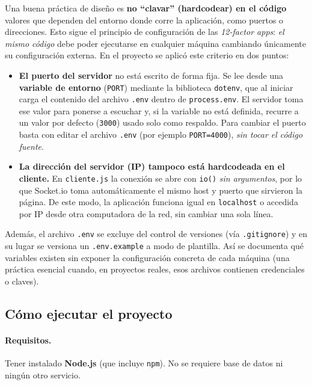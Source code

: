 \documentclass[12pt,a4paper]{article}
\begin{document}
Una buena práctica de diseño es \textbf{no ``clavar'' (hardcodear) en el código} valores que dependen del entorno donde corre la aplicación, como puertos o direcciones. Esto sigue el principio de configuración de las \textit{12-factor apps}: \emph{el mismo código} debe poder ejecutarse en cualquier máquina cambiando únicamente su configuración externa. En el proyecto se aplicó este criterio en dos puntos:

\begin{itemize}[leftmargin=1.4em]
    \item \textbf{El puerto del servidor} no está escrito de forma fija. Se lee desde una \textbf{variable de entorno} (\texttt{PORT}) mediante la biblioteca \texttt{dotenv}, que al iniciar carga el contenido del archivo \texttt{.env} dentro de \texttt{process.env}. El servidor toma ese valor para ponerse a escuchar y, si la variable no está definida, recurre a un valor por defecto (\texttt{3000}) usado solo como respaldo. Para cambiar el puerto basta con editar el archivo \texttt{.env} (por ejemplo \texttt{PORT=4000}), \emph{sin tocar el código fuente}.
    \item \textbf{La dirección del servidor (IP) tampoco está hardcodeada en el cliente.} En \texttt{cliente.js} la conexión se abre con \texttt{io()} \emph{sin argumentos}, por lo que Socket.io toma automáticamente el mismo host y puerto que sirvieron la página. De este modo, la aplicación funciona igual en \texttt{localhost} o accedida por IP desde otra computadora de la red, sin cambiar una sola línea.
\end{itemize}

Además, el archivo \texttt{.env} se excluye del control de versiones (vía \texttt{.gitignore}) y en su lugar se versiona un \texttt{.env.example} a modo de plantilla. Así se documenta qué variables existen sin exponer la configuración concreta de cada máquina (una práctica esencial cuando, en proyectos reales, esos archivos contienen credenciales o claves).

\subsection{Cómo ejecutar el proyecto}
\label{sec:ejecucion}

\paragraph{Requisitos.} Tener instalado \textbf{Node.js} (que incluye \texttt{npm}). No se requiere base de datos ni ningún otro servicio.
\end{document}
